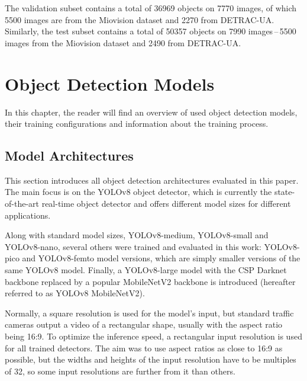 The validation subset contains a total of \num{36969} objects on \num{7770}
images, of which \num{5500} images are from the Miovision dataset and \num{2270}
from DETRAC-UA. Similarly, the test subset contains a total of \num{50357}
objects on \num{7990} images\,--\,\num{5500} images from the Miovision dataset and
\num{2490} from DETRAC-UA.




\chapter{Object Detection Models}





In this chapter, the reader will find an overview of used object detection
models, their training configurations and information about the training
process.


\section{Model Architectures}


This section introduces all object detection architectures evaluated in this
paper.  The main focus is on the YOLOv8 object detector, which is currently the
state-of-the-art real-time object detector and offers different model sizes for
different applications.

Along with standard model sizes, YOLOv8-medium, YOLOv8-small and YOLOv8-nano,
several others were trained and evaluated in this work: YOLOv8-pico and
YOLOv8-femto model versions, which are simply smaller versions of the same
YOLOv8 model. Finally, a YOLOv8-large model with the CSP Darknet backbone
replaced by a popular MobileNetV2 backbone is introduced (hereafter referred to
as YOLOv8 MobileNetV2). 

Normally, a square resolution is used for the model's input, but standard traffic cameras
output a video of a rectangular shape, usually with the aspect ratio being 16:9.
To optimize the inference speed, a rectangular input resolution is used for all
trained detectors. The aim was to use aspect ratios as close to 16:9 as
possible, but the widths and heights of the input resolution have to be multiples of
32, so some input resolutions are further from it than others.

